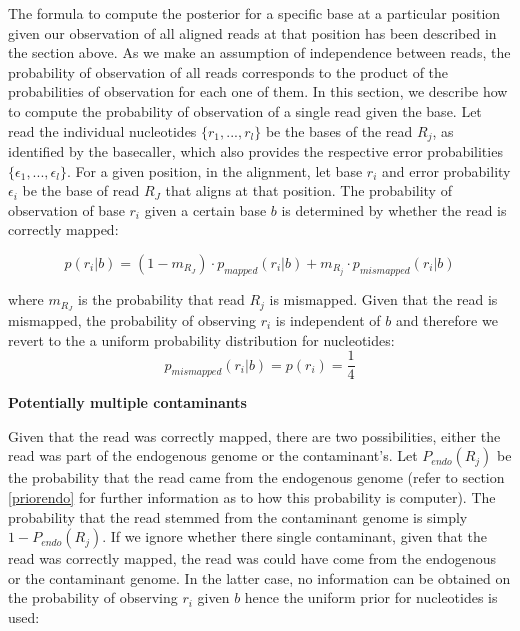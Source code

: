 \documentclass[a4paper,12pt]{article}
\begin{document}

\noindent The formula to compute the posterior for a specific base at a particular position given our observation of all aligned reads at that position has been described in the section above. As we make an assumption of independence between reads, the probability of observation of all reads corresponds to the product of the probabilities of observation for each one of them. In this section, we describe how to compute the probability of observation of a single read given the base. Let read the individual nucleotides $\{ r_1, ..., r_l \}$ be the bases of the read $R_j$, as identified by the basecaller, which also provides the respective error probabilities $\{ \epsilon_1, ..., \epsilon_l \}$. For a given position, in the alignment, let base $r_i$ and error probability $\epsilon_i$ be the base of read $R_J$ that aligns at that position. The probability of observation of base $r_i$ given a certain base $b$ is determined by whether the read is correctly mapped:

\begin{equation}
  p(r_i|b)   =  (1-m_{R_J}) \cdot p_{mapped}(r_i|b) + m_{R_j} \cdot p_{mismapped}(r_i|b) 
\end{equation} 

\noindent where $m_{R_J}$ is the probability that read $R_j$ is mismapped. Given that the read is mismapped, the probability of observing $r_i$ is independent of $b$ and therefore we revert to the a uniform probability distribution for nucleotides:
\begin{equation}
  p_{mismapped}(r_i|b)   =  p(r_i) =     \frac{ 1} {4} 
\end{equation} 



{\bf Potentially multiple contaminants}

Given that the read was correctly mapped, there are two possibilities, either the read was part of the endogenous genome or the contaminant's. Let $P_{endo}(R_j)$ be the probability that the read came from the endogenous genome (refer to section \ref{priorendo} for further information as to how this probability is computer). The probability that the read stemmed from the contaminant genome is simply $1-P_{endo}(R_j)$. If we ignore whether there single contaminant, given that the read was correctly mapped, the read was could have come from the endogenous or the contaminant genome. In the latter case, no information can be obtained on the probability of observing $r_i$ given $b$ hence the uniform prior for nucleotides is used:
\end{document}
